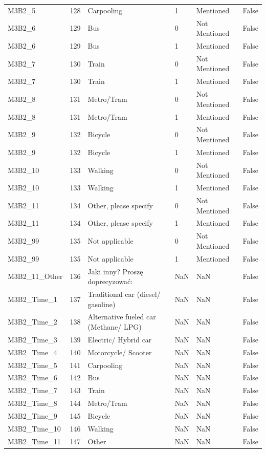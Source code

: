 \begin{tabular}{lrlllr}
M3B2_5 & 128 & Carpooling & 1 & Mentioned & False \\
M3B2_6 & 129 & Bus & 0 & Not Mentioned & False \\
M3B2_6 & 129 & Bus & 1 & Mentioned & False \\
M3B2_7 & 130 & Train & 0 & Not Mentioned & False \\
M3B2_7 & 130 & Train & 1 & Mentioned & False \\
M3B2_8 & 131 & Metro/Tram & 0 & Not Mentioned & False \\
M3B2_8 & 131 & Metro/Tram & 1 & Mentioned & False \\
M3B2_9 & 132 & Bicycle & 0 & Not Mentioned & False \\
M3B2_9 & 132 & Bicycle & 1 & Mentioned & False \\
M3B2_10 & 133 & Walking & 0 & Not Mentioned & False \\
M3B2_10 & 133 & Walking & 1 & Mentioned & False \\
M3B2_11 & 134 & Other, please specify & 0 & Not Mentioned & False \\
M3B2_11 & 134 & Other, please specify & 1 & Mentioned & False \\
M3B2_99 & 135 & Not applicable & 0 & Not Mentioned & False \\
M3B2_99 & 135 & Not applicable & 1 & Mentioned & False \\
M3B2_11_Other & 136 & Jaki inny? Proszę doprecyzować: & NaN & NaN & False \\
M3B2_Time_1 & 137 & Traditional car (diesel/ gasoline) & NaN & NaN & False \\
M3B2_Time_2 & 138 & Alternative fueled car (Methane/ LPG) & NaN & NaN & False \\
M3B2_Time_3 & 139 & Electric/ Hybrid car & NaN & NaN & False \\
M3B2_Time_4 & 140 & Motorcycle/ Scooter & NaN & NaN & False \\
M3B2_Time_5 & 141 & Carpooling & NaN & NaN & False \\
M3B2_Time_6 & 142 & Bus & NaN & NaN & False \\
M3B2_Time_7 & 143 & Train & NaN & NaN & False \\
M3B2_Time_8 & 144 & Metro/Tram & NaN & NaN & False \\
M3B2_Time_9 & 145 & Bicycle & NaN & NaN & False \\
M3B2_Time_10 & 146 & Walking & NaN & NaN & False \\
M3B2_Time_11 & 147 & Other & NaN & NaN & False \\

\end{tabular}
